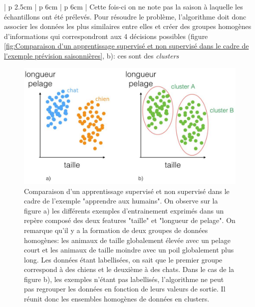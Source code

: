 \begin{table}[H]
\begin{tabular}{ | p {2.5cm} | p {6cm} | p {6cm} |}
	Cette fois-ci on ne note pas la saison à laquelle les échantillons ont été prélevés. Pour résoudre le problème, l'algorithme doit donc associer les données les plus similaires entre elles et créer des groupes homogènes d'informations qui correspondront aux 4 décisions possibles (figure \ref{fig:Comparaison d'un apprentissage supervisé et non supervisé dans le cadre de l'exemple prévision saisonnières}, b): ces sont des \emph{clusters} \\
	\hline
	\end{tabular}
	\caption[Comparaison des différents modèles d'apprentissage]{Comparaison de l'apprentissage supervisé et non supervisé par des exemples}
	\label {tab: Comparaison des différentes méthodes d'apprentissage}
\end{table}

\begin{figure}[H]
	\centering\includegraphics[width=13cm]{images/apprentissage_chat.jpeg}
	\caption[Comparaison d'un apprentissage supervisé et non supervisé dans le cadre de l'exemple "apprendre aux humains"]{Comparaison d'un apprentissage supervisé et non supervisé dans le cadre de l'exemple "apprendre aux humains". On observe sur la figure a) les différents exemples d'entrainement exprimés dans un repère composé des deux features "taille" et "longueur de pelage". On remarque qu'il y a la formation de deux groupes de données homogènes: les animaux de taille globalement élevée avec un pelage court et les animaux de taille moindre avec un poil globalement plus long. Les données étant labellisées, on sait que le premier groupe correspond à des chiens et le deuxième à des chats. Dans le cas de la figure b), les exemples n'étant pas labellisés, l'algorithme ne peut pas regrouper les données en fonction de leurs valeurs de sortie. Il réunit donc les ensembles homogènes de données en clusters.}
	\label{fig:Comparaison d'un apprentissage supervisé et non supervisé dans le cadre de l'exemple "apprendre aux humains"}
\end{figure}

